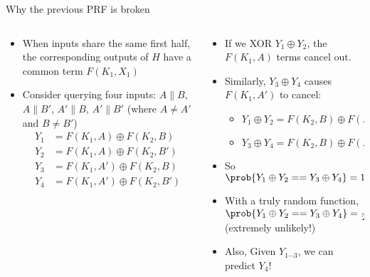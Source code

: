 \documentclass[aspectratio=169, lualatex, handout]{beamer}
\begin{document}
\begin{frame}{Why the previous PRF is broken}
	\begin{columns}[c]
		\begin{column}{0.5\textwidth}
			\begin{itemize}
				\item When inputs share the same first half, the corresponding outputs of $H$ have a common term $F(K_1, X_1)$
				\item Consider querying four inputs: $A\|B$, $A\|B'$, $A'\|B$, $A'\|B'$ (where $A \neq A'$ and $B \neq B'$)
				      \begin{align*}
					      Y_1 & = F(K_1, A) \oplus F(K_2, B)   \\
					      Y_2 & = F(K_1, A) \oplus F(K_2, B')  \\
					      Y_3 & = F(K_1, A') \oplus F(K_2, B)  \\
					      Y_4 & = F(K_1, A') \oplus F(K_2, B')
				      \end{align*}
			\end{itemize}
		\end{column}
		\begin{column}{0.5\textwidth}
			\begin{itemize}
				\item If we XOR $Y_1 \oplus Y_2$, the $F(K_1, A)$ terms cancel out.
				\item Similarly, $Y_3 \oplus Y_4$ causes $F(K_1, A')$ to cancel:
				      \begin{itemize}
					      \item $Y_1 \oplus Y_2 = F(K_2, B) \oplus F(K_2, B')$
					      \item $Y_3 \oplus Y_4 = F(K_2, B) \oplus F(K_2, B')$
				      \end{itemize}
				\item So $\prob{Y_1 \oplus Y_2 == Y_3 \oplus Y_4} = 1$
				\item With a truly random function, $\prob{Y_1 \oplus Y_2 == Y_3 \oplus Y_4} = \frac{1}{2^m}$ (extremely unlikely!)
				\item Also, Given $Y_{1\cdots3}$, we can predict $Y_4$!
			\end{itemize}
		\end{column}
	\end{columns}
\end{frame}
\end{document}
